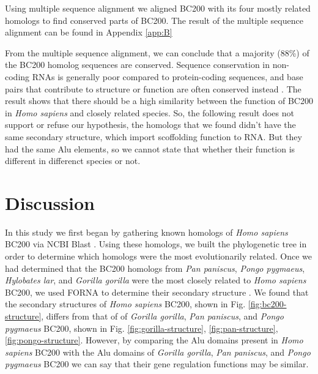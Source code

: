 \documentclass[conference, 11pt]{IEEEtran}
\begin{document}
Using multiple sequence alignment we aligned BC200 with its four mostly related homologs to find conserved parts of BC200. 
The result of the multiple sequence alignment can be found in Appendix \ref{app:B}

From the multiple sequence alignment, we can conclude that a majority (88\%) of the BC200 homolog sequences are conserved. 
Sequence conservation in non-coding RNAs is generally poor compared to protein-coding sequences, and base pairs that contribute to structure or function are often conserved instead \cite{johnsson2014evolutionary}. 
The result shows that there should be a high similarity between the function of BC200 in \emph{Homo sapiens} and closely related species. 
So, the following result does not support or refuse our hypothesis, the homologs that we found didn't have the same secondary structure, which import scoffolding function to RNA. But they had the same Alu elements, so we cannot state that whether their function is different in differenct species or not. 

\section{Discussion}\label{sec:discussion}

In this study we first began by gathering known homologs of \emph{Homo sapiens} BC200 via NCBI Blast \cite{blastTool,madden2012blast}. 
Using these homologs, we built the phylogenetic tree in order to determine which homologs were the most evolutionarily related. 
Once we had determined that the BC200 homologs from \emph{Pan paniscus}, \emph{Pongo pygmaeus}, \emph{Hylobates lar}, and \emph{Gorilla gorilla} were the most closely related to \emph{Homo sapiens} BC200, we used FORNA to determine their secondary structure \cite{lorenz2011viennarna}. 
We found that the secondary structures of \emph{Homo sapiens} BC200, shown in Fig. \ref{fig:bc200-structure}, differs from that of of \emph{Gorilla gorilla}, \emph{Pan paniscus}, and \emph{Pongo pygmaeus} BC200, shown in Fig. \ref{fig:gorilla-structure}, \ref{fig:pan-structure}, \ref{fig:pongo-structure}.
However, by comparing the Alu domains present in \emph{Homo sapiens} BC200 with the Alu domains of \emph{Gorilla gorilla}, \emph{Pan paniscus}, and \emph{Pongo pygmaeus} BC200 we can say that their gene regulation functions may be similar. 
\end{document}
